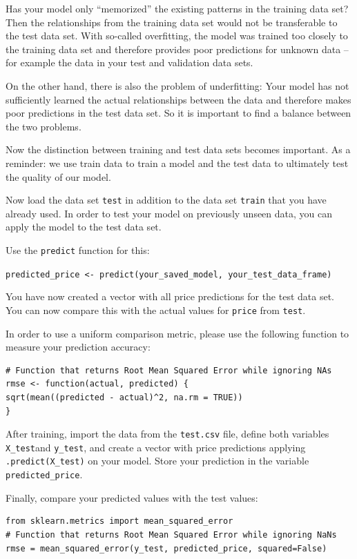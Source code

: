 \documentclass[
  11pt,
]{article}
\newenvironment{tips}[1]
  {
  \begin{itemize}
  \footnotesize
  \renewcommand{\labelitemi}{
    \raisebox{-.7\height}[0pt][0pt]{
      {\setkeys{Gin}{width=3em,keepaspectratio}
        \texttt{[image: images/\#1.png]}}
    }
  }
  \setlength{\fboxsep}{1em}
  \begin{rbox}
  \item
  }
  {
  \end{rbox}
  \end{itemize}
  }
\newenvironment{tipsp}[1]
  {
  \begin{itemize}
  \footnotesize
  \renewcommand{\labelitemi}{
    \raisebox{-.7\height}[0pt][0pt]{
      {\setkeys{Gin}{width=3em,keepaspectratio}
        \texttt{[image: images/\#1.png]}}
    }
  }
  \setlength{\fboxsep}{1em}
  \begin{pbox}
  \item
  }
  {
  \end{pbox}
  \end{itemize}
  }
\begin{document}
Has your model only ``memorized'' the existing patterns in the training data set?
Then the relationships from the training data set would not be transferable to the test data set. With so-called overfitting, the model was trained too closely to the training data set and therefore provides poor predictions for unknown data -- for example the data in your test and validation data sets.

On the other hand, there is also the problem of underfitting: Your model has not sufficiently learned the actual relationships between the data and therefore makes poor predictions in the test data set. So it is important to find a balance between the two problems.

Now the distinction between training and test data sets becomes important. As a reminder: we use train data to train a model and the test data to ultimately test the quality of our model.

Now load the data set \texttt{test} in addition to the data set \texttt{train} that you have already used. In order to test your model on previously unseen data, you can apply the model to the test data set.

\begin{tips}r

Use the \texttt{predict} function for this:

\texttt{predicted\_price\ \textless{}-\ predict(your\_saved\_model,\ your\_test\_data\_frame)}

You have now created a vector with all price predictions for the test data set. You can now compare this with the actual values for \texttt{price} from \texttt{test}.

In order to use a uniform comparison metric, please use the following function to measure your prediction accuracy:

\begin{verbatim}
# Function that returns Root Mean Squared Error while ignoring NAs
rmse <- function(actual, predicted) {
sqrt(mean((predicted - actual)^2, na.rm = TRUE))
}
\end{verbatim}


\end{tips}

\begin{tipsp}p

After training, import the data from the \texttt{test.csv} file, define both variables \texttt{X\_test}and \texttt{y\_test}, and create a vector with price predictions applying \texttt{.predict(X\_test)} on your model. Store your prediction in the variable \texttt{predicted\_price}.

Finally, compare your predicted values with the test values:

\begin{verbatim}
from sklearn.metrics import mean_squared_error
# Function that returns Root Mean Squared Error while ignoring NaNs
rmse = mean_squared_error(y_test, predicted_price, squared=False)
\end{verbatim}


\end{tipsp}
\end{document}
